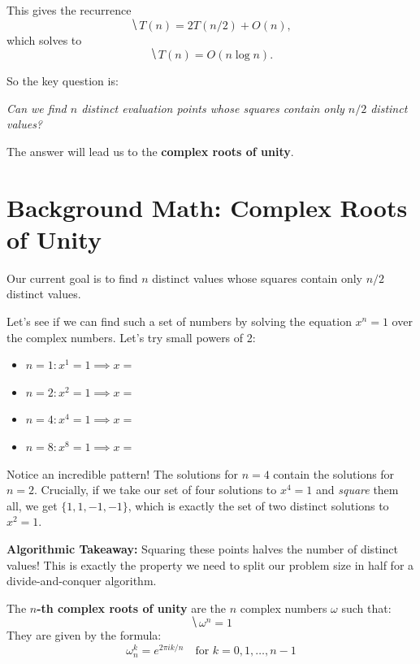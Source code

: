 \documentclass[11  pt]{article}
\begin{document}
This gives the recurrence
\[\hide{T(n) = 2T(n/2) + O(n),}\]
which solves to
\[\hide{T(n) = O(n\log n).}\]

\vs{0.5cm}

So the key question is:

\begin{center}
\emph{Can we find $n$ distinct evaluation points whose squares contain only $n/2$ distinct values?}
\end{center}

The answer will lead us to the \textbf{complex roots of unity}.

\newpage
\section{Background Math: Complex Roots of Unity}
Our current goal is to find $n$ distinct values whose squares contain only $n/2$ distinct values. 

\vs{1cm}

Let's see if we can find such a set of numbers by solving the equation $x^n = 1$ over the complex numbers. Let's try small powers of 2:

\vs{1cm}

\begin{itemize}
    \item $n=1: x^1 = 1 \implies x = $ 
    \item $n=2: x^2 = 1 \implies x = $ 
    \item $n=4: x^4 = 1 \implies x = $ 
    \item $n=8: x^8 = 1 \implies x = $ 
\end{itemize}

\vs{1cm}

Notice an incredible pattern! The solutions for $n=4$ contain the solutions for $n=2$. Crucially, if we take our set of four solutions to $x^4=1$ and \emph{square} them all, we get $\{1, 1, -1, -1\}$, which is exactly the set of two distinct solutions to $x^2=1$. 

\vs{1cm}

\textbf{Algorithmic Takeaway:} Squaring these points halves the number of distinct values! This is exactly the property we need to split our problem size in half for a divide-and-conquer algorithm.

\vs{1cm}

\begin{definition} \noindent The \textbf{$n$-th complex roots of unity} are the $n$ complex numbers $\omega$ such that:
    \begin{equation*}
        \hide{\omega^n = 1}
    \end{equation*}
    They are given by the formula:
    \begin{equation*}
        \omega_n^k = e^{2\pi i k / n} \quad \text{for } k = 0, 1, \hdots, n-1
    \end{equation*}
\end{definition}
\end{document}
